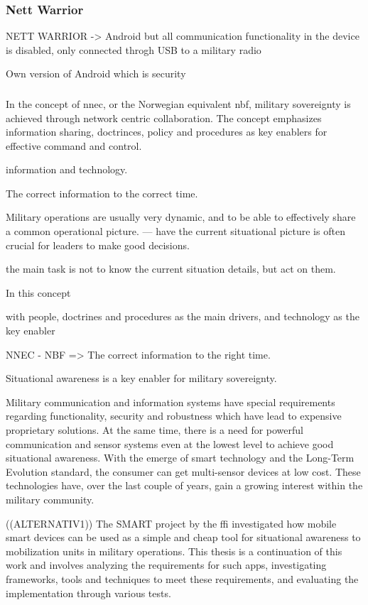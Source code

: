 \subsubsection{Nett Warrior} 
NETT WARRIOR -> Android but all communication functionality in the device is disabled, only connected throgh USB to a military radio

Own version of Android which is security 

\subsubsection{}

In the concept of \gls{nnec}, or the Norwegian equivalent \gls{nbf}, military sovereignty is achieved through network centric collaboration.  The concept emphasizes information sharing, doctrinces, policy and procedures as key enablers for effective command and control. 

information and technology. 

The correct information to the correct time. 

Military operations are usually very dynamic, and to be able to effectively share a common operational picture. --- have the current situational picture is often crucial for leaders to make good decisions. 

the main task is not to know the current situation details, but act on them.  


In this concept 


 with people, doctrines and procedures as the main drivers, and technology as the key enabler%

NNEC - NBF => The correct information to the right time.

Situational awareness is a key enabler for military sovereignty. 

Military communication and information systems have special requirements regarding functionality, security and robustness which have lead to expensive proprietary solutions. At the same time, there is a need for powerful communication and sensor systems even at the lowest level to achieve good situational awareness. With the emerge of smart technology and the Long-Term Evolution standard, the consumer can get multi-sensor devices at low cost. These technologies have, over the last couple of years, gain a growing interest within the military community.


((ALTERNATIV1))
The SMART project by the \gls{ffi} investigated how mobile smart devices can be used as a simple and cheap tool for situational awareness to mobilization units in military operations. This thesis is a continuation of this work and involves analyzing the requirements for such apps, investigating frameworks, tools and techniques to meet these requirements, and evaluating the implementation through various tests. 


